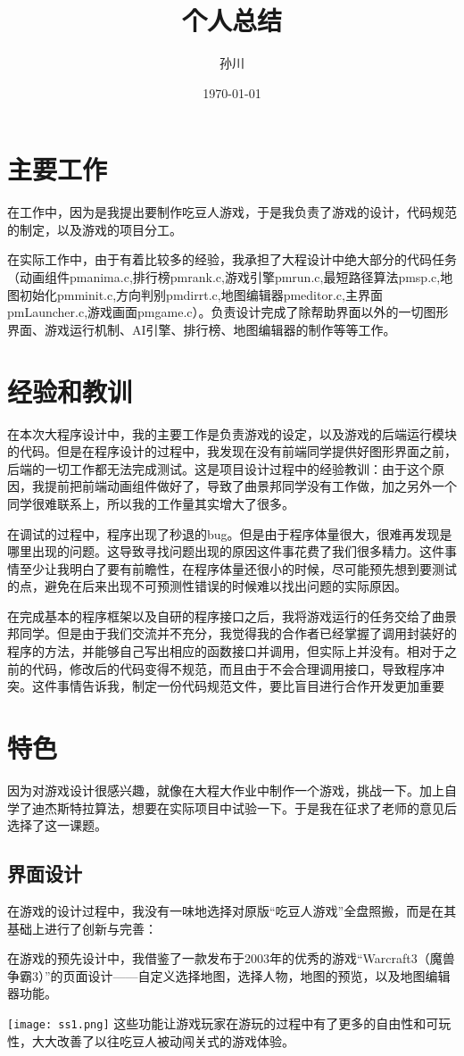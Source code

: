 \documentclass[utf8]{ctexart}
\title{个人总结}
\author{孙川}
\date{\today}
\begin{document}
\maketitle
\tableofcontents
\section{主要工作}
在工作中，因为是我提出要制作吃豆人游戏，于是我负责了游戏的设计，代码规范的制定，以及游戏的项目分工。\par
在实际工作中，由于有着比较多的经验，我承担了大程设计中绝大部分的代码任务（动画组件pmanima.c,排行榜pmrank.c,游戏引擎pmrun.c,最短路径算法pmsp.c,地图初始化pmminit.c,方向判别pmdirrt.c,地图编辑器pmeditor.c,主界面pmLauncher.c,游戏画面pmgame.c）。负责设计完成了除帮助界面以外的一切图形界面、游戏运行机制、AI引擎、排行榜、地图编辑器的制作等等工作。
\section{经验和教训}
在本次大程序设计中，我的主要工作是负责游戏的设定，以及游戏的后端运行模块的代码。但是在程序设计的过程中，我发现在没有前端同学提供好图形界面之前，后端的一切工作都无法完成测试。这是项目设计过程中的经验教训：由于这个原因，我提前把前端动画组件做好了，导致了曲景邦同学没有工作做，加之另外一个同学很难联系上，所以我的工作量其实增大了很多。\par
在调试的过程中，程序出现了秒退的bug。但是由于程序体量很大，很难再发现是哪里出现的问题。这导致寻找问题出现的原因这件事花费了我们很多精力。这件事情至少让我明白了要有前瞻性，在程序体量还很小的时候，尽可能预先想到要测试的点，避免在后来出现不可预测性错误的时候难以找出问题的实际原因。\par
在完成基本的程序框架以及自研的程序接口之后，我将游戏运行的任务交给了曲景邦同学。但是由于我们交流并不充分，我觉得我的合作者已经掌握了调用封装好的程序的方法，并能够自己写出相应的函数接口并调用，但实际上并没有。相对于之前的代码，修改后的代码变得不规范，而且由于不会合理调用接口，导致程序冲突。这件事情告诉我，制定一份代码规范文件，要比盲目进行合作开发更加重要\par
\section{特色}
因为对游戏设计很感兴趣，就像在大程大作业中制作一个游戏，挑战一下。加上自学了迪杰斯特拉算法，想要在实际项目中试验一下。于是我在征求了老师的意见后选择了这一课题。\par
\subsection{界面设计}
在游戏的设计过程中，我没有一味地选择对原版“吃豆人游戏”全盘照搬，而是在其基础上进行了创新与完善：\par
在游戏的预先设计中，我借鉴了一款发布于2003年的优秀的游戏“Warcraft3（魔兽争霸3）”的页面设计——自定义选择地图，选择人物，地图的预览，以及地图编辑器功能。\par
\texttt{[image: ss1.png]}
这些功能让游戏玩家在游玩的过程中有了更多的自由性和可玩性，大大改善了以往吃豆人被动闯关式的游戏体验。\par
\end{document}
